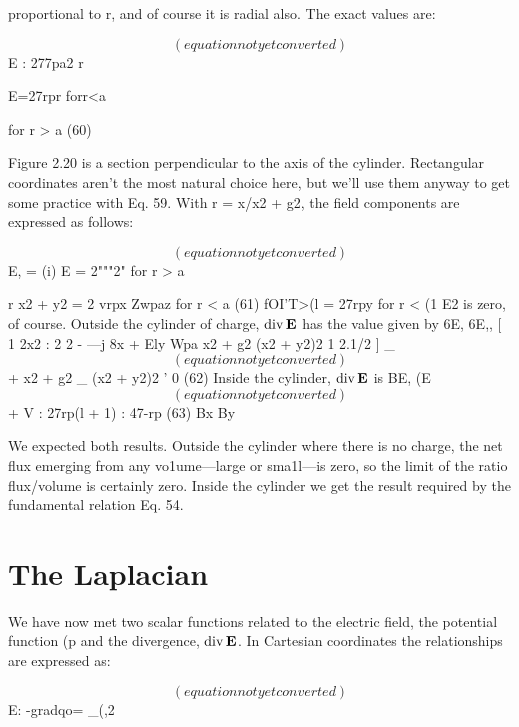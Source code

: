 proportional to r, and of course it is radial also. The exact values
are:

\begin{equation}
(equation not yet converted)
\end{equation}
E : 277pa2
r

E=27rpr forr<a

for r > a
(60)

Figure 2.20 is a section perpendicular to the axis of the cylinder.
Rectangular coordinates aren't the most natural choice here, but
we'll use them anyway to get some practice with Eq. 59. With
r = x/x2 + g2, the field components are expressed as follows:

\begin{equation}
(equation not yet converted)
\end{equation}
E, = (i) E = 2"""2" for r > a

r x2 + y2
= 2
vrpx Zwpaz for r < a (61)
 fOI'T>(l
= 27rpy for r < (1
E2 is zero, of course.
Outside the cylinder of charge, $\operatorname{div}\mathbf{E}$ has the value given by
6E, 6E,, [ 1 2x2
: 2 2 - ---j
8x + Ely Wpa x2 + g2 (x2 + y2)2
1 2.1/2 ] _
\begin{equation}
(equation not yet converted)
\end{equation}
+ x2 + g2 _ (x2 + y2)2 ' 0 (62)
Inside the cylinder, $\operatorname{div}\mathbf{E}$ is
BE, (E
\begin{equation}
(equation not yet converted)
\end{equation}
+ V : 27rp(l + 1) : 47-rp (63)
Bx By

We expected both results. Outside the cylinder where there is no
charge, the net flux emerging from any vo1ume---large or sma1l---is
zero, so the limit of the ratio flux/volume is certainly zero. Inside the
cylinder we get the result required by the fundamental relation Eq. 54.

\section{The Laplacian}

We have now met two scalar functions related to the electric field,
the potential function (p and the divergence, $\operatorname{div}\mathbf{E}$. In Cartesian coordinates
the relationships are expressed as:

\begin{equation}
(equation not yet converted)
\end{equation}
E: -gradqo= _(,2%

